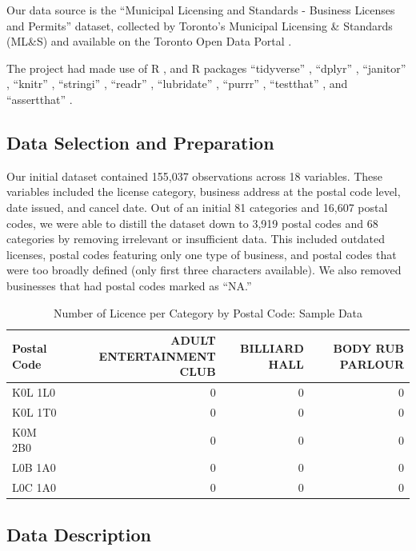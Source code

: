 \documentclass[
]{article}
\begin{document}
Our data source is the ``Municipal Licensing and Standards - Business Licenses and Permits'' dataset, collected by Toronto's Municipal Licensing \& Standards (ML\&S) and available on the Toronto Open Data Portal \citep{citedata}.

The project had made use of R \citep{citeR}, and R packages ``tidyverse'' \citep{citetidyverse}, ``dplyr'' \citep{citedplyr}, ``janitor'' \citep{citejanitor}, ``knitr'' \citep{citeknitr}, ``stringi'' \citep{stringi}, ``readr'' \citep{readr}, ``lubridate'' \citep{lubridate}, ``purrr'' \citep{purrr}, ``testthat'' \citep{testthat}, and ``assertthat'' \citep{assertthat}.

\hypertarget{data-selection-and-preparation}{%
\subsection{Data Selection and Preparation}\label{data-selection-and-preparation}}

Our initial dataset contained 155,037 observations across 18 variables. These variables included the license category, business address at the postal code level, date issued, and cancel date. Out of an initial 81 categories and 16,607 postal codes, we were able to distill the dataset down to 3,919 postal codes and 68 categories by removing irrelevant or insufficient data. This included outdated licenses, postal codes featuring only one type of business, and postal codes that were too broadly defined (only first three characters available). We also removed businesses that had postal codes marked as ``NA.''

\begin{table}[H]

\caption{\label{tab:clean}Number of Licence per Category by Postal Code: Sample Data}
\centering
\fontsize{10}{12}\selectfont
\begin{tabular}[t]{lrrr}
\toprule
Postal Code & ADULT ENTERTAINMENT CLUB & BILLIARD HALL & BODY RUB PARLOUR\\
\midrule
K0L 1L0 & 0 & 0 & 0\\
K0L 1T0 & 0 & 0 & 0\\
K0M 2B0 & 0 & 0 & 0\\
L0B 1A0 & 0 & 0 & 0\\
L0C 1A0 & 0 & 0 & 0\\
\bottomrule
\end{tabular}
\end{table}

\hypertarget{data-description}{%
\subsection{Data Description}\label{data-description}}
\end{document}
